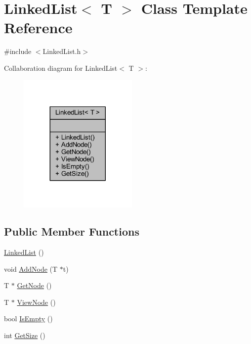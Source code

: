 \hypertarget{class_linked_list}{}\section{Linked\+List$<$ T $>$ Class Template Reference}
\label{class_linked_list}


{\ttfamily \#include $<$Linked\+List.\+h$>$}



Collaboration diagram for Linked\+List$<$ T $>$\+:
\nopagebreak
\begin{figure}[H]
\begin{center}
\leavevmode
\includegraphics[width=164pt]{class_linked_list__coll__graph}
\end{center}
\end{figure}
\subsection*{Public Member Functions}
\begin{DoxyCompactItemize}
\item 
\hyperlink{class_linked_list_a3c20fcfec867e867f541061a09fc640c}{Linked\+List} ()
\item 
void \hyperlink{class_linked_list_aa0846665f0375a005b79631142eec7fb}{Add\+Node} (T $\ast$t)
\item 
T $\ast$ \hyperlink{class_linked_list_a94a6f58f1b437c08d398c3c5d6b038e1}{Get\+Node} ()
\item 
T $\ast$ \hyperlink{class_linked_list_a926040c8f7faa215988def48e41797e5}{View\+Node} ()
\item 
bool \hyperlink{class_linked_list_ac5a0d903d22d1157e98b6d3c182e1c74}{Is\+Empty} ()
\item 
int \hyperlink{class_linked_list_a2ec266fa30f649a81f930eff858a030f}{Get\+Size} ()
\end{DoxyCompactItemize}


